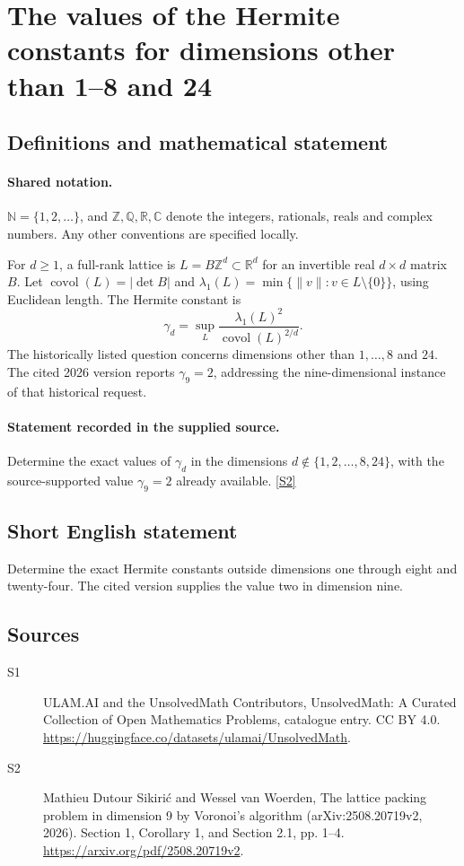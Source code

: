 \documentclass[11pt]{article}
\newcommand{\sref}[2]{\hyperlink{source:#1:#2}{[S#2]}}
\begin{document}
\section{The values of the Hermite constants for dimensions other than 1–8 and 24}\label{statement}

\subsection{Definitions and mathematical statement}

\paragraph{Shared notation.}$\mathbb N=\{1,2,\ldots\}$, and $\mathbb Z,\mathbb Q,\mathbb R,\mathbb C$ denote the integers, rationals, reals and complex numbers. Any other conventions are specified locally.


For $d\geq1$, a full-rank lattice is $L=B\mathbb Z^d\subset\mathbb R^d$ for an invertible real $d\times d$ matrix $B$. Let $\operatorname{covol}(L)=|\det B|$ and $\lambda_1(L)=\min\{\|v\|:v\in L\setminus\{0\}\}$, using Euclidean length. The Hermite constant is
\[\gamma_d=\sup_L\frac{\lambda_1(L)^2}{\operatorname{covol}(L)^{2/d}}.\]
The historically listed question concerns dimensions other than $1,\ldots,8$ and $24$. The cited 2026 version reports $\gamma_9=2$, addressing the nine-dimensional instance of that historical request.
\paragraph{Statement recorded in the supplied source.}
Determine the exact values of $\gamma_d$ in the dimensions $d\notin\{1,2,\ldots,8,24\}$, with the source-supported value $\gamma_9=2$ already available. \sref{statement}{2}
\subsection{Short English statement}
Determine the exact Hermite constants outside dimensions one through eight and twenty-four. The cited version supplies the value two in dimension nine.
\subsection{Sources}
\begin{description}
\item[\hypertarget{source:statement:1}{S1}] ULAM.AI and the UnsolvedMath Contributors, UnsolvedMath: A Curated Collection of Open Mathematics Problems, catalogue entry. CC BY 4.0. \url{https://huggingface.co/datasets/ulamai/UnsolvedMath}.
\item[\hypertarget{source:statement:2}{S2}] Mathieu Dutour Sikirić and Wessel van Woerden, The lattice packing problem in dimension 9 by Voronoi’s algorithm (arXiv:2508.20719v2, 2026). Section 1, Corollary 1, and Section 2.1, pp. 1–4. \url{https://arxiv.org/pdf/2508.20719v2}.
\end{description}
\label{end:statement}
\end{document}
